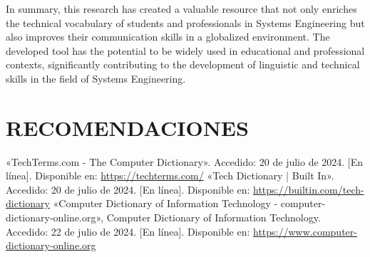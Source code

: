 In summary, this research has created a valuable resource that not only enriches the technical vocabulary of students and professionals in Systems Engineering but also improves their communication skills in a globalized environment. The developed tool has the potential to be widely used in educational and professional contexts, significantly contributing to the development of linguistic and technical skills in the field of Systems Engineering.
\section{RECOMENDACIONES}

\clearpage
\begin{thebibliography}{X}
     «TechTerms.com - The Computer Dictionary». Accedido: 20 de julio de 2024. [En línea]. Disponible en: \url{https://techterms.com/}
     «Tech Dictionary | Built In». Accedido: 20 de julio de 2024. [En línea]. Disponible en: \url{https://builtin.com/tech-dictionary}
     «Computer Dictionary of Information Technology - computer-dictionary-online.org», Computer Dictionary of Information Technology. Accedido: 22 de julio de 2024. [En línea]. Disponible en: \url{https://www.computer-dictionary-online.org}

\end{thebibliography}
